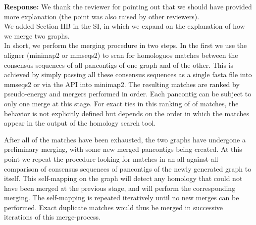 \documentclass[aps,rmp,onecolumn]{revtex4-1}
\newcommand{\response}[1]{{\it {\color{response}\textbf{Response:} #1}}\vskip 5mm}
\newcommand{\SIalgo}{II}
\begin{document}
\response{We thank the reviewer for pointing out that we should have provided more explanation (the point was also raised by other reviewers).\\
We added Section {\SIalgo}B in the SI, in which we expand on the explanation of how we merge two graphs.\\
In short, we perform the merging procedure in two steps. In the first we use the aligner (minimap2 or mmseqs2) to scan for homologuos matches between the consensus sequences of all pancontigs of one graph and of the other.
This is achieved by simply passing all these consensus sequences as a single fasta file into mmseqs2 or via the API into minimap2.
The resulting matches are ranked by pseudo-energy and mergers performed in order.
Each pancontig can be subject to only one merge at this stage.
For exact ties in this ranking of of matches, the behavior is not explicitly defined but depends on the order in which the matches appear in the output of the homology search tool. 

After all of the matches have been exhausted, the two graphs have undergone a preliminary merging, with some new merged pancontigs being created. 
At this point we repeat the procedure looking for matches in an all-against-all comparison of consensus sequences of pancontigs of the newly generated graph to itself. 
This self-mapping on the graph will detect any homology that could not have been merged at the previous stage, and will perform the corresponding merging. 
The self-mapping is repeated iteratively until no new merges can be performed.
Exact duplicate matches would thus be merged in successive iterations of this merge-process.
}
\end{document}

